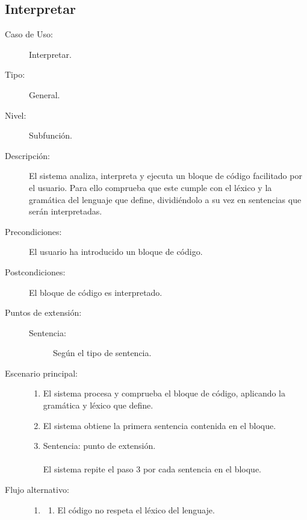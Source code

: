 \subsection{Interpretar}
\begin{framed}
\FloatBarrier
\begin{description}
   \item[Caso de Uso:]  Interpretar.
   \item[Tipo:] General.
   \item[Nivel:]  Subfunción.
   \item[Descripción:] 
   El sistema analiza, interpreta y ejecuta un bloque de código facilitado por el usuario.
   Para ello comprueba que este cumple con el léxico y la gramática del lenguaje 
   que define, dividiéndolo a su vez en sentencias que serán interpretadas. 
   \item[Precondiciones:] 
   El usuario ha introducido un bloque de código.
   \item[Postcondiciones:] 
   El bloque de código es interpretado.
   \item [Puntos de extensión:] \hfill
   \begin{description}
      \item[Sentencia:] Según el tipo de sentencia.
   \end{description}
   \item[Escenario principal:] \hfill
   \begin{enumerate}
   \item El sistema procesa y comprueba el bloque de código, aplicando
   la gramática y léxico que define.
   \item El sistema obtiene la primera sentencia contenida en el bloque.
   \item Sentencia: punto de extensión. \\\\\hfill\hfill
   El sistema repite el paso 3 por cada sentencia en el bloque.
   \end{enumerate}
   \item[Flujo alternativo:] \hfill 
   \begin{enumerate} \itemsep1pt \parskip0pt 
   \setcounter{enumi}{0}
   \renewcommand{\labelenumi}{}
   \renewcommand{\labelenumiii}{\arabic{enumiii}.}
   \renewcommand{\labelenumii}{\arabic{enumi}\alph{enumii}.}
      \item 
      \begin {enumerate}
         \setcounter{enumii}{0}
         \item El código no respeta el léxico del lenguaje.

\end{enumerate}
\end{enumerate}
\end{description}
\end{framed}
